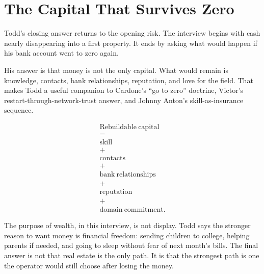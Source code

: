 \documentclass[11pt,oneside]{book}
\begin{document}
\section{The Capital That Survives Zero}

Todd's closing answer returns to the opening risk. The interview begins with cash nearly disappearing into a first property. It ends by asking what would happen if his bank account went to zero again.

His answer is that money is not the only capital. What would remain is knowledge, contacts, bank relationships, reputation, and love for the field. That makes Todd a useful companion to Cardone's ``go to zero'' doctrine, Victor's restart-through-network-trust answer, and Johnny Anton's skill-as-insurance sequence.

\begin{equation}
\begin{gathered}
\mathrm{Rebuildable\ capital}\\
=\\
\mathrm{skill}\\
+\\
\mathrm{contacts}\\
+\\
\mathrm{bank\ relationships}\\
+\\
\mathrm{reputation}\\
+\\
\mathrm{domain\ commitment}.
\end{gathered}
\end{equation}

The purpose of wealth, in this interview, is not display. Todd says the stronger reason to want money is financial freedom: sending children to college, helping parents if needed, and going to sleep without fear of next month's bills. The final answer is not that real estate is the only path. It is that the strongest path is one the operator would still choose after losing the money.

\end{document}
